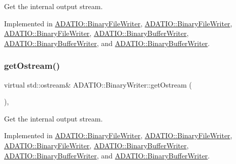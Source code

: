 Get the internal output stream. 



Implemented in \mbox{\hyperlink{classADATIO_1_1BinaryFileWriter_a2506200a774d4823088a0365e0452d9a}{A\+D\+A\+T\+I\+O\+::\+Binary\+File\+Writer}}, \mbox{\hyperlink{classADATIO_1_1BinaryFileWriter_a2506200a774d4823088a0365e0452d9a}{A\+D\+A\+T\+I\+O\+::\+Binary\+File\+Writer}}, \mbox{\hyperlink{classADATIO_1_1BinaryFileWriter_a2506200a774d4823088a0365e0452d9a}{A\+D\+A\+T\+I\+O\+::\+Binary\+File\+Writer}}, \mbox{\hyperlink{classADATIO_1_1BinaryBufferWriter_a587ce48f0cf6dd4064edde6db836c0a3}{A\+D\+A\+T\+I\+O\+::\+Binary\+Buffer\+Writer}}, \mbox{\hyperlink{classADATIO_1_1BinaryBufferWriter_a587ce48f0cf6dd4064edde6db836c0a3}{A\+D\+A\+T\+I\+O\+::\+Binary\+Buffer\+Writer}}, and \mbox{\hyperlink{classADATIO_1_1BinaryBufferWriter_a587ce48f0cf6dd4064edde6db836c0a3}{A\+D\+A\+T\+I\+O\+::\+Binary\+Buffer\+Writer}}.

\mbox{\label{classADATIO_1_1BinaryWriter_a4fe227341d17d012bb83a070c208dac0}} 
\subsubsection{\texorpdfstring{getOstream()}{getOstream()}\hspace{0.1cm}{\footnotesize\ttfamily [3/3]}}
{\footnotesize\ttfamily virtual std\+::ostream\& A\+D\+A\+T\+I\+O\+::\+Binary\+Writer\+::get\+Ostream (\begin{DoxyParamCaption}{ }\end{DoxyParamCaption})\hspace{0.3cm}{\ttfamily [protected]}, {}}



Get the internal output stream. 



Implemented in \mbox{\hyperlink{classADATIO_1_1BinaryFileWriter_a2506200a774d4823088a0365e0452d9a}{A\+D\+A\+T\+I\+O\+::\+Binary\+File\+Writer}}, \mbox{\hyperlink{classADATIO_1_1BinaryFileWriter_a2506200a774d4823088a0365e0452d9a}{A\+D\+A\+T\+I\+O\+::\+Binary\+File\+Writer}}, \mbox{\hyperlink{classADATIO_1_1BinaryFileWriter_a2506200a774d4823088a0365e0452d9a}{A\+D\+A\+T\+I\+O\+::\+Binary\+File\+Writer}}, \mbox{\hyperlink{classADATIO_1_1BinaryBufferWriter_a587ce48f0cf6dd4064edde6db836c0a3}{A\+D\+A\+T\+I\+O\+::\+Binary\+Buffer\+Writer}}, \mbox{\hyperlink{classADATIO_1_1BinaryBufferWriter_a587ce48f0cf6dd4064edde6db836c0a3}{A\+D\+A\+T\+I\+O\+::\+Binary\+Buffer\+Writer}}, and \mbox{\hyperlink{classADATIO_1_1BinaryBufferWriter_a587ce48f0cf6dd4064edde6db836c0a3}{A\+D\+A\+T\+I\+O\+::\+Binary\+Buffer\+Writer}}.

